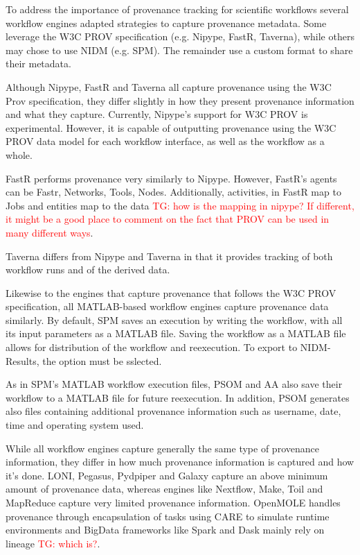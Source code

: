 \documentclass{report}
\newcommand{\tristan}[1]{\textcolor{red}{TG: #1}}
\begin{document}
            To address the importance of provenance tracking for scientific 
            workflows several workflow engines adapted strategies to capture 
            provenance metadata. Some leverage the W3C PROV specification (e.g.
            Nipype, FastR, Taverna), while others may chose to use NIDM (e.g. 
            SPM). The 
            remainder use a custom format to share their metadata.

            Although Nipype, FastR and Taverna all capture provenance using 
            the W3C Prov specification, they differ slightly in how they
            present provenance
            information and what they capture.
            Currently, Nipype's support for W3C PROV is experimental. However,
            it is capable of outputting provenance using the W3C PROV data 
            model for each workflow interface, as well as the workflow as a 
            whole.
    
            FastR performs provenance very similarly to Nipype. However,
            FastR's agents can be Fastr, Networks, Tools, Nodes. Additionally,
            activities, in
            FastR map to Jobs and entities map to the data \tristan{how is the mapping in nipype? If different,
            it might be a good place to comment on the fact that PROV can be used
            in many different ways}.
    
            Taverna differs from Nipype and Taverna in that it provides 
            tracking of
            both workflow runs and of the derived data.

            Likewise to the engines that capture provenance that follows the
            W3C PROV specification, all MATLAB-based workflow engines capture
            provenance data similarly.
            By default, SPM saves an execution by writing the  workflow, with
            all its input parameters as a MATLAB file. Saving the workflow as
            a MATLAB file allows for distribution of the workflow and 
            reexecution. To export to NIDM-Results, the option must be 
            sslected.
            
            As in SPM's MATLAB workflow execution files, PSOM and AA 
            also save
            their workflow to a MATLAB file for future reexecution. 
            In addition, PSOM generates
            also files containing additional provenance information such 
            as username, date, time and operating system used.
            
            While all workflow engines capture generally the same type of 
            provenance information, they differ in how much provenance 
            information is captured and how it's done. LONI, Pegasus, Pydpiper 
            and Galaxy
            capture an above minimum amount of provenance data, whereas engines 
            like Nextflow, Make, Toil and MapReduce capture very limited  
            provenance 
            information. OpenMOLE handles provenance through encapsulation of
            tasks using CARE to simulate runtime environments
            and BigData frameworks like Spark and Dask mainly rely on 
            lineage \tristan{which is?}.
\end{document}
